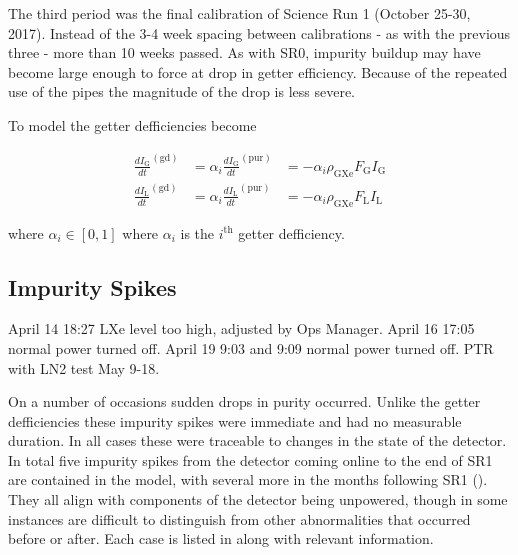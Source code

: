The third period was the final  calibration of Science Run 1 (October 25-30, 2017).  Instead of the 3-4 week spacing between
calibrations - as with the previous three - more than 10 weeks passed.  As with SR0, impurity buildup may have become
large enough to force at drop in getter efficiency.  Because of the repeated use of the pipes the magnitude of the drop is less severe.

To model the getter defficiencies 
become

\begin{subequations}
\begin{align}
\frac{dI_{\mathrm{G}}}{dt}^{(\mathrm{gd})} &= \alpha_i \frac{dI_{\mathrm{G}}}{dt}^{(\mathrm{pur})} &=
-\alpha_i \rho_{\mathrm{GXe}} F_{\mathrm{G}} I_{\mathrm{G}}
\label{eq:electron_lifetime_model_detector_effects_getter_gxe}
\\
\frac{dI_{\mathrm{L}}}{dt}^{(\mathrm{gd})} &= \alpha_i \frac{dI_{\mathrm{L}}}{dt}^{(\mathrm{pur})} &=
-\alpha_i \rho_{\mathrm{GXe}} F_{\mathrm{L}} I_{\mathrm{L}}
\label{eq:electron_lifetime_model_detector_effects_getter_lxe}
\end{align}
\end{subequations}

\noindent where $\alpha_i \in [0, 1]$ where $\alpha_i$ is the $i^{\mathrm{th}}$ getter defficiency.



\subsection{Impurity Spikes}
\label{subsec:electron_lifetime_model_detector_effects_spikes}
April 14 18:27 LXe level too high, adjusted by Ops Manager.  April 16 17:05 normal power turned off.  April 19 9:03 and 9:09 normal power
turned off.  PTR with LN2 test May 9-18.

On a number of occasions sudden drops in purity occurred.  Unlike the getter defficiencies these impurity spikes were immediate and
had no measurable duration.  In all cases these were traceable to changes in the state of the detector.  In total five impurity spikes
from the detector coming online to the end of SR1 are contained in the model, with several more in the months following SR1
().  They all align with components of the detector being unpowered, though in some
instances are difficult to distinguish from other abnormalities that occurred before or after.  Each case is listed in
 along with relevant information.

